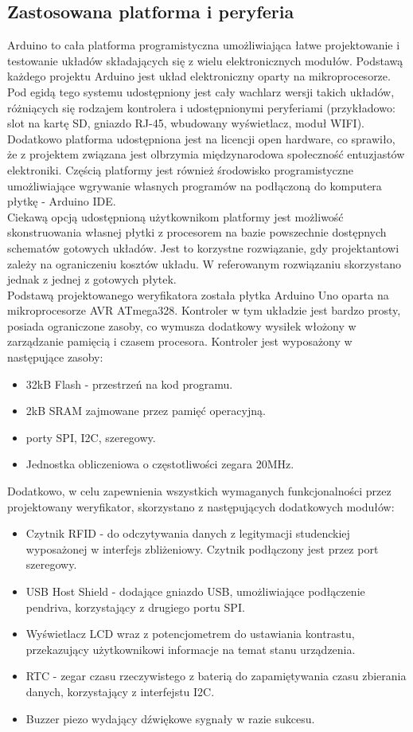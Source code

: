 \documentclass[declaration,shortabstract, mgr]{iithesis}
\begin{document}
\subsection{Zastosowana platforma i peryferia}
\indent Arduino to cała platforma programistyczna umożliwiająca łatwe projektowanie i testowanie układów składających się z wielu elektronicznych modułów. Podstawą każdego projektu Arduino jest układ elektroniczny oparty na mikroprocesorze. Pod egidą tego systemu udostępniony jest cały wachlarz wersji takich układów, różniących się rodzajem kontrolera i udostępnionymi peryferiami (przykładowo: slot na kartę SD, gniazdo RJ-45, wbudowany wyświetlacz, moduł WIFI). Dodatkowo platforma udostępniona jest na licencji open hardware, co sprawiło, że z projektem związana jest olbrzymia międzynarodowa społeczność entuzjastów elektroniki. Częścią platformy jest również środowisko programistyczne umożliwiające wgrywanie własnych programów na podłączoną do komputera płytkę - Arduino IDE.\\
\indent Ciekawą opcją udostępnioną użytkownikom platformy jest możliwość skonstruowania własnej płytki z procesorem na bazie powszechnie dostępnych schematów gotowych układów. Jest to korzystne rozwiązanie, gdy projektantowi zależy na ograniczeniu kosztów układu. W referowanym rozwiązaniu skorzystano jednak z jednej z gotowych płytek.\\
\indent Podstawą projektowanego weryfikatora została płytka Arduino Uno oparta na mikroprocesorze AVR ATmega328. Kontroler w tym układzie jest bardzo prosty, posiada ograniczone zasoby, co wymusza dodatkowy wysiłek włożony w zarządzanie pamięcią i czasem procesora. Kontroler jest wyposażony w następujące zasoby:
\begin{itemize}
\item 32kB Flash - przestrzeń na kod programu.
\item 2kB SRAM zajmowane przez pamięć operacyjną.
\item porty SPI, I2C, szeregowy.
\item Jednostka obliczeniowa o częstotliwości zegara 20MHz.
\end{itemize}
\indent Dodatkowo, w celu zapewnienia wszystkich wymaganych funkcjonalności przez projektowany weryfikator, skorzystano z następujących dodatkowych modułów:
\begin{itemize}
\item Czytnik RFID - do odczytywania danych z legitymacji studenckiej wyposażonej w interfejs zbliżeniowy. Czytnik podłączony jest przez port szeregowy.
\item USB Host Shield - dodające gniazdo USB, umożliwiające podłączenie pendriva, korzystający z drugiego portu SPI.
\item Wyświetlacz LCD wraz z potencjometrem do ustawiania kontrastu, przekazujący użytkownikowi informacje na temat stanu urządzenia.
\item RTC - zegar czasu rzeczywistego z baterią do zapamiętywania czasu zbierania danych, korzystający z interfejstu I2C.
\item Buzzer piezo wydający dźwiękowe sygnały w razie sukcesu.
\end{itemize}
\end{document}
